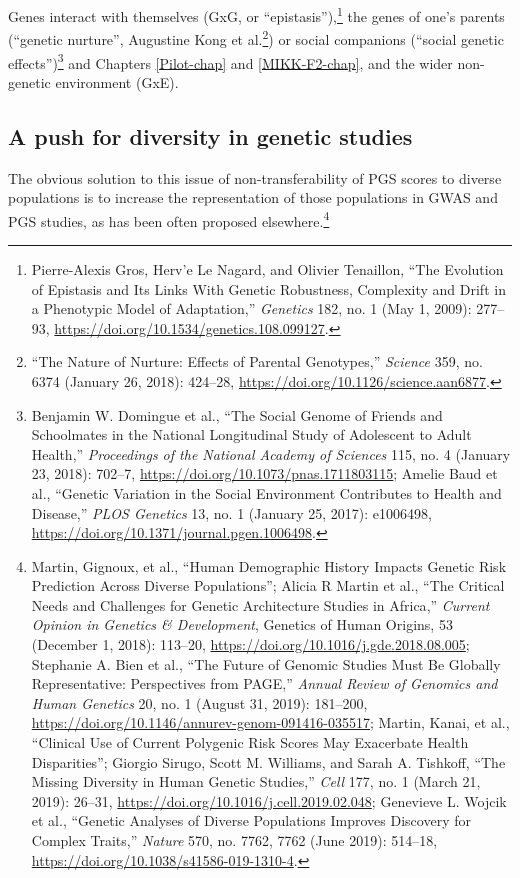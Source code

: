 \documentclass[
]{book}
\begin{document}
Genes interact with themselves (GxG, or ``epistasis''),\footnote{Pierre-Alexis Gros, Herv'e Le Nagard, and Olivier Tenaillon, {``The {Evolution} of {Epistasis} and {Its Links With Genetic Robustness}, {Complexity} and {Drift} in a {Phenotypic Model} of {Adaptation},''} \emph{Genetics} 182, no. 1 (May 1, 2009): 277--93, \url{https://doi.org/10.1534/genetics.108.099127}.} the genes of one's parents (``genetic nurture'', Augustine Kong et al.\footnote{{``The Nature of Nurture: {Effects} of Parental Genotypes,''} \emph{Science} 359, no. 6374 (January 26, 2018): 424--28, \url{https://doi.org/10.1126/science.aan6877}.}) or social companions (``social genetic effects'')\footnote{Benjamin W. Domingue et al., {``The Social Genome of Friends and Schoolmates in the {National Longitudinal Study} of {Adolescent} to {Adult Health},''} \emph{Proceedings of the National Academy of Sciences} 115, no. 4 (January 23, 2018): 702--7, \url{https://doi.org/10.1073/pnas.1711803115}; Amelie Baud et al., {``Genetic {Variation} in the {Social Environment Contributes} to {Health} and {Disease},''} \emph{PLOS Genetics} 13, no. 1 (January 25, 2017): e1006498, \url{https://doi.org/10.1371/journal.pgen.1006498}.} and Chapters \ref{Pilot-chap} and \ref{MIKK-F2-chap}, and the wider non-genetic environment (GxE).

\hypertarget{a-push-for-diversity-in-genetic-studies}{%
\subsection{A push for diversity in genetic studies}\label{a-push-for-diversity-in-genetic-studies}}

The obvious solution to this issue of non-transferability of PGS scores to diverse populations is to increase the representation of those populations in GWAS and PGS studies, as has been often proposed elsewhere.\footnote{Martin, Gignoux, et al., {``Human Demographic History Impacts Genetic Risk Prediction Across Diverse Populations''}; Alicia R Martin et al., {``The Critical Needs and Challenges for Genetic Architecture Studies in {Africa},''} \emph{Current Opinion in Genetics \& Development}, Genetics of {Human Origins}, 53 (December 1, 2018): 113--20, \url{https://doi.org/10.1016/j.gde.2018.08.005}; Stephanie A. Bien et al., {``The {Future} of {Genomic Studies Must Be Globally Representative}: {Perspectives} from {PAGE},''} \emph{Annual Review of Genomics and Human Genetics} 20, no. 1 (August 31, 2019): 181--200, \url{https://doi.org/10.1146/annurev-genom-091416-035517}; Martin, Kanai, et al., {``Clinical Use of Current Polygenic Risk Scores May Exacerbate Health Disparities''}; Giorgio Sirugo, Scott M. Williams, and Sarah A. Tishkoff, {``The {Missing Diversity} in {Human Genetic Studies},''} \emph{Cell} 177, no. 1 (March 21, 2019): 26--31, \url{https://doi.org/10.1016/j.cell.2019.02.048}; Genevieve L. Wojcik et al., {``Genetic Analyses of Diverse Populations Improves Discovery for Complex Traits,''} \emph{Nature} 570, no. 7762, 7762 (June 2019): 514--18, \url{https://doi.org/10.1038/s41586-019-1310-4}.}
\end{document}

